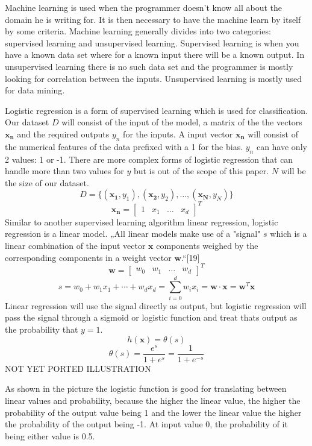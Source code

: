 Machine learning is used when the programmer doesn't know all about the domain he is writing for. It is then necessary to have the machine learn by itself by some criteria. Machine learning generally divides into two categories: supervised learning and unsupervised learning. Supervised learning is when you have a known data set where for a known input there will be a known output. In unsupervised learning there is no such data set and the programmer is mostly looking for correlation between the inputs. Unsupervised learning is mostly used for data mining.

Logistic regression is a form of supervised learning which is used for classification. Our dataset $D$ will consist of the input of the model, a matrix of the the vectors $\mathbf{x_n}$ and the required outputs $y_n$ for the inputs. A input vector $\mathbf{x_n}$ will consist of the numerical features of the data prefixed with a 1 for the bias. $y_n$ can have only 2 values: 1 or -1. There are more complex forms of logistic regression that can handle more than two values for $y$ but is out of the scope of this paper. $N$ will be the size of our dataset.
\[ D = \{ (\mathbf{x_1}, y_1), (\mathbf{x_2}, y_2), \ldots, (\mathbf{x_N}, y_N)\} \]
\[ \mathbf{x_n} = [ \begin{array}{cccc} 1 & x_1 & \ldots & x_d\end{array} ]^T \]
Similar to another supervised learning algorithm linear regression, logistic regression is a linear model. „All linear models make use of a "signal" $s$ which is a linear combination of the input vector $\mathbf{x}$ components weighed by the corresponding components in a weight vector $\mathbf{w}$.“[19]
\[\mathbf{w} = [\begin{array}{cccc} w_0 & w_1 & \ldots & w_d \end{array} ]^T \]
\[s = w_0 + w_1 x_1 + \cdots + w_d x_d = \sum_{i=0}^d w_i x_i = \mathbf{w} \cdot \mathbf{x} = \mathbf{w}^T \mathbf{x}\]
Linear regression will use the signal directly as output, but logistic regression will pass the signal through a sigmoid or logistic function and treat thats output as the probability that $y=1$.
\[h(\mathbf{x}) = \theta(s)\]
\[\theta(s) = \frac{e^s}{1+e^s} = \frac{1}{1 + e^{-s}}\]
NOT YET PORTED ILLUSTRATION

As shown in the picture the logistic function is good for translating between linear values and probability, because the higher the linear value, the higher the probability of the output value being 1 and the lower the linear value the higher the probability of the output being -1. At input value 0, the probability of it being either value is 0.5.

